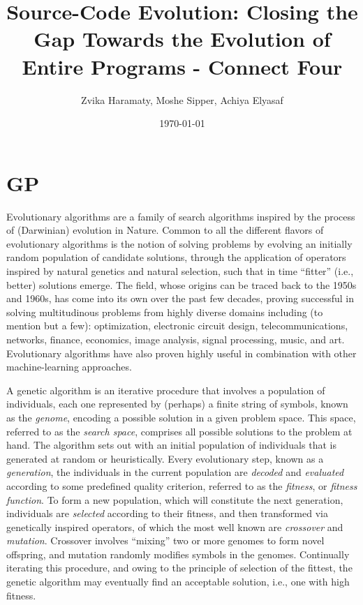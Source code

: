 \documentclass{article}
\title{Source-Code Evolution: Closing the Gap Towards the Evolution of Entire Programs - Connect Four}
\author{Zvika Haramaty, Moshe Sipper, Achiya Elyasaf}
\date{\today}
\begin{document}
    \maketitle


    \section{GP}
    Evolutionary algorithms are a family of search algorithms inspired by the process of (Darwinian) evolution in Nature. Common to all the different flavors of evolutionary algorithms is the notion of solving problems by evolving an initially random population of candidate solutions, through the application of operators inspired by natural genetics and natural selection, such that in time ``fitter'' (i.e., better) solutions emerge. The field, whose origins can be traced back to the 1950s and 1960s, has come into its own over the past few decades, proving successful in solving multitudinous problems from highly diverse domains including (to mention but a few): optimization, electronic circuit design, telecommunications, networks, finance, economics, image analysis, signal processing, music, and art. Evolutionary algorithms have also proven highly useful in combination with other machine-learning approaches.

    A genetic algorithm is an iterative procedure that involves a population of individuals, each one
    represented by (perhaps) a finite string of symbols, known as the \emph{genome}, encoding a possible solution in a given problem space. This space, referred to as the \emph{search space}, comprises all possible solutions to the problem at hand. The algorithm sets out with an initial population of individuals that is generated at random or heuristically. Every evolutionary step, known as a \emph{generation}, the individuals in the current population are \emph{decoded} and \emph{evaluated} according to some predefined quality criterion, referred to as the \emph{fitness}, or \emph{fitness function}. To form a new population, which will constitute the next generation, individuals are \emph{selected} according to their fitness, and then transformed via genetically inspired operators, of which the most well known are \emph{crossover} and \emph{mutation}. Crossover involves ``mixing'' two or more genomes to form novel offspring, and mutation randomly modifies symbols in the genomes. Continually iterating this procedure, and owing to the principle of selection of the fittest, the genetic algorithm may eventually find an acceptable solution, i.e., one with high fitness.
\end{document}
